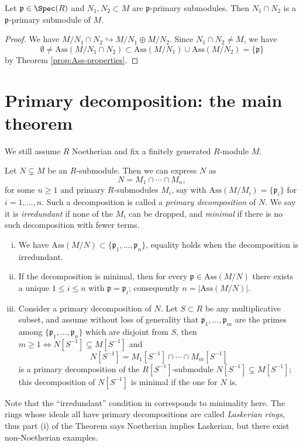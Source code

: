 \begin{lemma}\label{prop:intersection-primary}
	Let $\mathfrak{p} \in \Spec(R)$ and $N_1, N_2 \subset M$ are $\mathfrak{p}$-primary submodules. Then $N_1 \cap N_2$ is a $\mathfrak{p}$-primary submodule of $M$.
\end{lemma}
\begin{proof}
	We have $M/N_1 \cap N_2 \hookrightarrow M/N_1 \oplus M/N_2$. Since $N_1 \cap N_2 \neq M$, we have
	\[ \emptyset \neq \text{Ass}(M/N_1 \cap N_2) \subset \text{Ass}(M/N_1) \cup \text{Ass}(M/N_2) = \{\mathfrak{p}\} \]
	by Theorem \ref{prop:Ass-properties}.
\end{proof}

\section{Primary decomposition: the main theorem}
We still assume $R$ Noetherian and fix a finitely generated $R$-module $M$.

\begin{theorem}\label{prop:primary-decomp}
	Let $N \subsetneq M$ be an $R$-submodule. Then we can express $N$ as
	\[ N = M_1 \cap \cdots \cap M_n, \]
	for some $n \geq 1$ and primary $R$-submodules $M_i$, say with $\mathrm{Ass}(M/M_i) = \{\mathfrak{p}_i\}$ for $i = 1, \ldots, n$. Such a decomposition is called a \emph{primary decomposition} of $N$. We say it is \emph{irredundant} if none of the $M_i$ can be dropped, and \emph{minimal} if there is no such decomposition with fewer terms.
	\begin{enumerate}[(i)]
		\item We have $\mathrm{Ass}(M/N) \subset \{ \mathfrak{p}_1, \ldots, \mathfrak{p}_n \}$, equality holds when the decomposition is irredundant.
		\item If the decomposition is minimal, then for every $\mathfrak{p} \in \mathrm{Ass}(M/N)$ there exists a unique $1 \leq i \leq n$ with $\mathfrak{p} = \mathfrak{p}_i$; consequently $n = |\mathrm{Ass}(M/N)|$.
		\item Consider a primary decomposition of $N$. Let $S \subset R$ be any multiplicative subset, and assume without loss of generality that $\mathfrak{p}_1, \ldots, \mathfrak{p}_m$ are the primes among $\{\mathfrak{p}_1, \ldots, \mathfrak{p}_n \}$ which are disjoint from $S$, then $m \geq 1 \iff N[S^{-1}] \subsetneq M[S^{-1}]$ and
		\[ N[S^{-1}] = M_1[S^{-1}] \cap \cdots \cap M_m[S^{-1}] \]
		is a primary decomposition of the $R[S^{-1}]$-submodule $N[S^{-1}] \subsetneq M[S^{-1}]$; this decomposition of $N[S^{-1}]$ is minimal if the one for $N$ is.
	\end{enumerate}
\end{theorem}
Note that the ``irredundant'' condition in \cite[(8.D)]{Mat80} corresponds to minimality here. The rings whose ideals all have primary decompositions are called \emph{Laskerian rings}, thus part (i) of the Theorem says Noetherian implies Laskerian, but there exist non-Noetherian examples.

